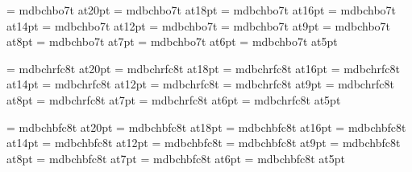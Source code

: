 \font\twentyslbf=      mdbchbo7t at20pt
\font\eighteenslbf=    mdbchbo7t at18pt
\font\sixteenslbf=     mdbchbo7t at16pt
\font\fourteenslbf=    mdbchbo7t at14pt
\font\twelveslbf=      mdbchbo7t at12pt
\font\slbf=            mdbchbo7t
\font\nineslbf=        mdbchbo7t at9pt
\font\eightslbf=       mdbchbo7t at8pt
\font\sevenslbf=       mdbchbo7t at7pt
\font\sixslbf=         mdbchbo7t at6pt
\font\fiveslbf=        mdbchbo7t at5pt

\font\twentycaps=      mdbchrfc8t at20pt
\font\eighteencaps=    mdbchrfc8t at18pt
\font\sixteencaps=     mdbchrfc8t at16pt
\font\fourteencaps=    mdbchrfc8t at14pt
\font\twelvecaps=      mdbchrfc8t at12pt
\font\caps=            mdbchrfc8t
\font\ninecaps=        mdbchrfc8t at9pt
\font\eightcaps=       mdbchrfc8t at8pt
\font\sevencaps=       mdbchrfc8t at7pt
\font\sixcaps=         mdbchrfc8t at6pt
\font\fivecaps=        mdbchrfc8t at5pt

\font\twentycapsbf=      mdbchbfc8t at20pt
\font\eighteencapsbf=    mdbchbfc8t at18pt
\font\sixteencapsbf=     mdbchbfc8t at16pt
\font\fourteencapsbf=    mdbchbfc8t at14pt
\font\twelvecapsbf=      mdbchbfc8t at12pt
\font\capsbf=            mdbchbfc8t
\font\ninecapsbf=        mdbchbfc8t at9pt
\font\eightcapsbf=       mdbchbfc8t at8pt
\font\sevencapsbf=       mdbchbfc8t at7pt
\font\sixcapsbf=         mdbchbfc8t at6pt
\font\fivecapsbf=        mdbchbfc8t at5pt

\teni=-0.01pt    %

\rm 